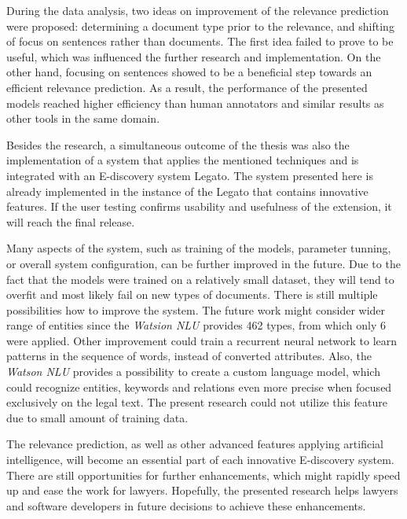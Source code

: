 \documentclass[
  digital, %
  notable,   %
  nolof,     %
  nolot,     %
]{fithesis3}
\begin{document}
During the data analysis, two ideas on improvement of the relevance prediction were proposed: determining a document type prior to the relevance, and shifting of focus on sentences rather than documents.
The first idea failed to prove to be useful, which was influenced the further research and implementation.
On the other hand, focusing on sentences showed to be a beneficial step towards an efficient relevance prediction.
As a result, the performance of the presented models reached higher efficiency than human annotators and similar results as other tools in the same domain.

Besides the research, a simultaneous outcome of the thesis was also the implementation of a system that applies the mentioned techniques and is integrated with an E-discovery system Legato.
The system presented here is already implemented in the instance of the Legato that contains innovative features.
If the user testing confirms usability and usefulness of the extension, it will reach the final release.

Many aspects of the system, such as training of the models, parameter tunning, or overall system configuration, can be further improved in the future.
Due to the fact that the models were trained on a relatively small dataset, they will tend to overfit and most likely fail on new types of documents. There is still multiple possibilities how to improve the system.
The future work might consider wider range of entities since the \textit{Watsion NLU} provides 462 types, from which only 6 were applied.
Other improvement could train a recurrent neural network to learn patterns in the sequence of words, instead of converted attributes.
Also, the \textit{Watson NLU} provides a possibility to create a custom language model, which could recognize entities, keywords and relations even more precise when focused exclusively on the legal text. The present research could not utilize this feature due to small amount of training data.

The relevance prediction, as well as other advanced features applying artificial intelligence, will become an essential part of each innovative E-discovery system.
There are still opportunities for further enhancements, which might rapidly speed up and ease the work for lawyers.
Hopefully, the presented research helps lawyers and software developers in future decisions to achieve these enhancements.

\printbibliography[heading=bibintoc] %

\appendix %
\end{document}

